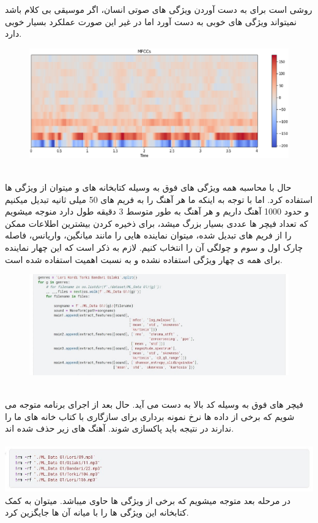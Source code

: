 \documentclass[10pt,onecolumn,a4paper]{article}
\begin{document}
روشی است برای به دست آوردن ویژگی های صوتی انسان، اگر موسیقی بی کلام باشد نمیتواند ویژگی های خوبی به دست آورد اما در غیر این صورت عملکرد بسیار خوبی دارد.\\ 
\begin{figure}[h!]
        \centering
        \includegraphics[scale=0.5]{8.png}
        \caption{  }  
    \end{figure}
    \\
    حال با محاسبه همه ویژگی های فوق به وسیله کتابخانه های  و   میتوان از ویژگی ها استفاده کرد. اما  با توجه به اینکه ما هر آهنگ را به فریم های 50 میلی ثانیه تبدیل میکنیم و حدود 1000 آهنگ داریم و هر آهنگ به طور متوسط 3 دقیقه طول دارد منوجه میشویم که تعداد فیچر ها عددی بسیار بزرگ میشد، برای ذخیره کردن بیشترین اطلاعات ممکن را از فریم های تبدیل شده، میتوان نماینده هایی را مانند میانگین، واریانس، فاصله چارک اول و سوم و چولگی آن را انتخاب کنیم. لازم به ذکر است که این چهار نماینده برای همه ی چهار ویژگی استفاده نشده و به نسبت اهمیت استفاده شده است.\\
    \begin{figure}[h!]
        \centering
        \includegraphics[scale=0.45]{9.jpg}
    \end{figure}
    
\\
فیچر های فوق به وسیله کد بالا به دست می آید. حال بعد از اجرای برنامه متوجه می شویم که برخی از داده ها نرخ نمونه برداری برای سازگاری با کتاب خانه های ما را ندارند در نتیجه باید پاکسازی شوند. آهنگ های زیر حذف شده اند.
\\
\\
\includegraphics[scale=0.55]{10.jpg}
\\
در مرحله بعد متوجه میشویم که برخی از ویژگی ها حاوی   میباشد. میتوان به کمک کتابخانه   این ویژگی ها را با میانه آن ها جایگزین کرد.\\
\end{document}
